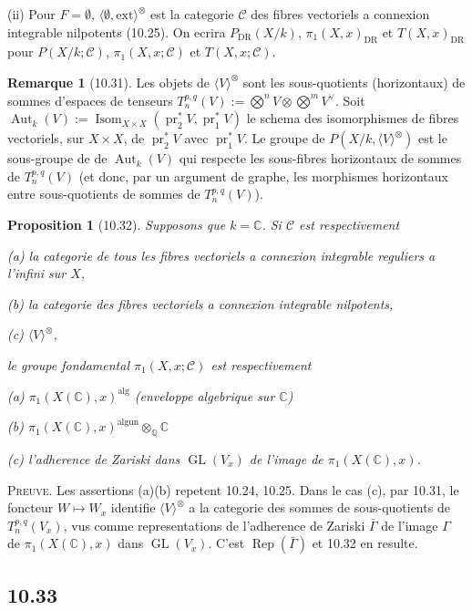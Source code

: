 \documentclass[12pt,a4paper]{article}
\theoremstyle{plain}
\newtheorem{proposition}[theorem]{Proposition}
\theoremstyle{definition}
\newtheorem{remark}[theorem]{Remarque}
\theoremstyle{remark}
\DeclareMathOperator{\Isom}{Isom}
\DeclareMathOperator{\Aut}{Aut}
\DeclareMathOperator{\GL}{GL}
\DeclareMathOperator{\pr}{pr}
\DeclareMathOperator{\Rep}{Rep}
\newcommand{\Q}{\mathbb{Q}}
\newcommand{\C}{\mathbb{C}}
\newcommand{\DR}{\mathrm{DR}}
\newcommand{\alg}{\mathrm{alg}}
\newcommand{\un}{\mathrm{un}}
\newcommand{\ext}{\mathrm{ext}}
\begin{document}
(ii) Pour $F = \emptyset$, $\langle \emptyset, \ext \rangle^{\otimes}$ est la categorie $\mathcal{C}$ des fibres vectoriels a connexion integrable nilpotents (10.25). On ecrira $P_{\DR}(X/k)$, $\pi_1(X, x)_{\DR}$ et $T(X, x)_{\DR}$ pour $P(X/k; \mathcal{C})$, $\pi_1(X, x; \mathcal{C})$ et $T(X, x; \mathcal{C})$.

\begin{remark}[10.31]
Les objets de $\langle V \rangle^{\otimes}$ sont les sous-quotients (horizontaux) de sommes d'espaces de tenseurs $T^{p,q}_n(V) := \bigotimes^n V \otimes \bigotimes^m V^\vee$. Soit $\Aut_k(V) := \Isom_{X \times X}(\pr_2^* V, \pr_1^* V)$ le schema des isomorphismes de fibres vectoriels, sur $X \times X$, de $\pr_2^* V$ avec $\pr_1^* V$. Le groupe de $P(X/k, \langle V \rangle^{\otimes})$ est le sous-groupe de de $\Aut_k(V)$ qui respecte les sous-fibres horizontaux de sommes de $T^{p,q}_n(V)$ (et donc, par un argument de graphe, les morphismes horizontaux entre sous-quotients de sommes de $T^{p,q}_n(V)$).
\end{remark}

\begin{proposition}[10.32]
Supposons que $k = \C$. Si $\mathcal{C}$ est respectivement

(a) la categorie de tous les fibres vectoriels a connexion integrable reguliers a l'infini sur $X$,

(b) la categorie des fibres vectoriels a connexion integrable nilpotents,

(c) $\langle V \rangle^{\otimes}$,

le groupe fondamental $\pi_1(X, x; \mathcal{C})$ est respectivement

(a) $\pi_1(X(\C), x)^{\alg}$ (enveloppe algebrique sur $\C$)

(b) $\pi_1(X(\C), x)^{\alg \un} \otimes_{\Q} \C$

(c) l'adherence de Zariski dans $\GL(V_x)$ de l'image de $\pi_1(X(\C), x)$.
\end{proposition}

\textsc{Preuve.} Les assertions (a)(b) repetent 10.24, 10.25. Dans le cas (c), par 10.31, le foncteur $W \mapsto W_x$ identifie $\langle V \rangle^{\otimes}$ a la categorie des sommes de sous-quotients de $T^{p,q}_n(V_x)$, vus comme representations de l'adherence de Zariski $\bar{\Gamma}$ de l'image $\Gamma$ de $\pi_1(X(\C), x)$ dans $\GL(V_x)$. C'est $\Rep(\bar{\Gamma})$ et 10.32 en resulte.

\subsection*{10.33}
\end{document}
